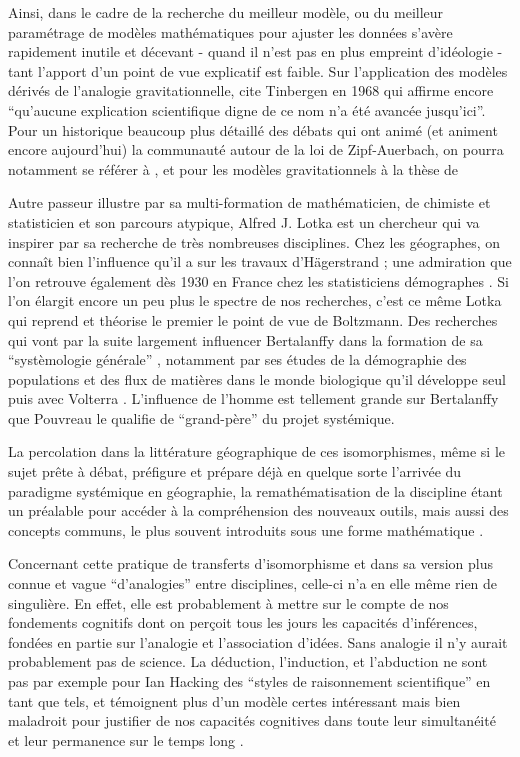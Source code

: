 Ainsi, dans le cadre de la recherche du meilleur modèle, ou du meilleur paramétrage de modèles mathématiques pour ajuster les données s'avère rapidement inutile et décevant - quand il n'est pas en plus empreint d'idéologie - tant l'apport d'un point de vue explicatif est faible. Sur l'application des modèles dérivés de l'analogie gravitationnelle, \textcite[37]{Pumain1982} cite Tinbergen en 1968 qui affirme encore \enquote{qu'aucune explication scientifique digne de ce nom n'a été avancée jusqu'ici}. Pour un historique beaucoup plus détaillé des débats qui ont animé (et animent encore aujourd'hui) la communauté autour de la loi de Zipf-Auerbach, on pourra notamment se référer à \textcite{Pumain1982,Pumain2012}, et pour les modèles gravitationnels à la thèse de \textcite{JensenButler1970} %

Autre passeur illustre par sa multi-formation de mathématicien, de chimiste et statisticien et son parcours atypique, Alfred J. Lotka est un chercheur qui va inspirer par sa recherche de très nombreuses disciplines. Chez les géographes, on connaît bien l'influence qu'il a sur les travaux d'Hägerstrand \autocite[95]{Claval2007}; une admiration que l'on retrouve également dès 1930 en France chez les statisticiens démographes \autocite{Veron2009}. Si l'on élargit encore un peu plus le spectre de nos recherches, c'est ce même Lotka qui reprend et théorise le premier le point de vue de Boltzmann. Des recherches qui vont par la suite largement influencer Bertalanffy dans la formation de sa \enquote{systèmologie générale} \autocite[178]{Pouvreau2013}, notamment par ses études de la démographie des populations et des flux de matières dans le monde biologique qu'il développe seul puis avec Volterra \autocite[545-546]{Pouvreau2013}. L'influence de l'homme est tellement grande sur Bertalanffy que Pouvreau le qualifie de \enquote{grand-père} du projet systémique.

La percolation dans la littérature géographique de ces isomorphismes, même si le sujet prête à débat, préfigure et prépare déjà en quelque sorte l'arrivée du paradigme systémique en géographie, la remathématisation de la discipline étant un préalable pour accéder à la compréhension des nouveaux outils, mais aussi des concepts communs, le plus souvent introduits sous une forme mathématique \autocite[432]{Ackerman1963}. 

Concernant cette pratique de transferts d'isomorphisme et dans sa version plus connue et vague \enquote{d'analogies} entre disciplines, celle-ci n'a en elle même rien de singulière. En effet, elle est probablement à mettre sur le compte de nos fondements cognitifs dont on perçoit tous les jours les capacités d'inférences, fondées en partie sur l’analogie et l'association d'idées. Sans analogie il n'y aurait probablement pas de science. La déduction, l'induction, et l'abduction ne sont pas par exemple pour Ian Hacking des \enquote{styles de raisonnement scientifique}  en tant que tels, et témoignent plus d'un modèle certes intéressant mais bien maladroit pour justifier de nos capacités cognitives dans toute leur simultanéité et leur permanence sur le temps long \autocite[98]{Hacking1989}.

